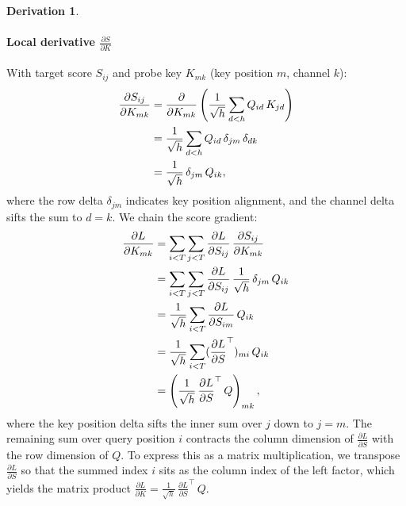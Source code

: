 \documentclass[letterpaper, 10 pt, conference]{ieeeconf}
\newcommand{\pdv}[2]{\frac{\partial #1}{\partial #2}}
\newcommand{\dL}[1]{\pdv{L}{#1}}
\newcommand{\kron}[2]{\delta_{#1 #2}}
\theoremstyle{definition}
\newtheorem*{derivation}{Derivation}
\begin{document}
\begin{derivation}
  \paragraph{Local derivative $\pdv{S}{K}$}
  With target score $S_{ij}$ and probe key $K_{mk}$ (key position $m$, channel $k$):
  \begin{align}
    \pdv{S_{ij}}{K_{mk}}
     & = \pdv{}{K_{mk}} \left( \frac{1}{\sqrt{h}} \sum_{d<h} Q_{id}\,K_{jd} \right) \notag \\
     & = \frac{1}{\sqrt{h}} \sum_{d<h} Q_{id}\,\kron{j}{m}\,\kron{d}{k} \notag             \\
     & = \frac{1}{\sqrt{h}}\,\kron{j}{m}\,Q_{ik},
    \label{eq:att-dsdk}
  \end{align}
  where the row delta $\kron{j}{m}$ indicates key position alignment, and the channel delta sifts the sum to $d = k$. We chain the score gradient:
  \begin{align}
    \dL{K_{mk}}
     & = \sum_{i<T} \sum_{j<T} \dL{S_{ij}}\,\pdv{S_{ij}}{K_{mk}} \notag                    \\
     & = \sum_{i<T} \sum_{j<T} \dL{S_{ij}}\,\frac{1}{\sqrt{h}}\,\kron{j}{m}\,Q_{ik} \notag \\
     & = \frac{1}{\sqrt{h}} \sum_{i<T} \dL{S_{im}}\,Q_{ik} \notag                          \\
     & = \frac{1}{\sqrt{h}} \sum_{i<T} (\dL{S}^{\top})_{mi}\,Q_{ik} \notag                 \\
     & = \left( \frac{1}{\sqrt{h}}\,\dL{S}^{\top}\,Q \right)_{mk},
    \label{eq:att-chain-dk}
  \end{align}
  where the key position delta sifts the inner sum over $j$ down to $j = m$. The remaining sum over query position $i$ contracts the column dimension of $\dL{S}$ with the row dimension of $Q$. To express this as a matrix multiplication, we transpose $\dL{S}$ so that the summed index $i$ sits as the column index of the left factor, which yields the matrix product $\dL{K} = \frac{1}{\sqrt{h}}\,\dL{S}^{\top}\,Q$.


\end{derivation}
\end{document}
